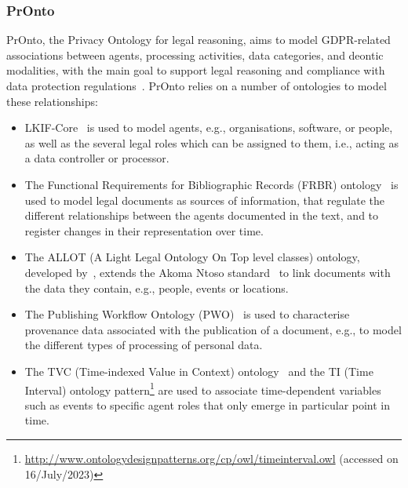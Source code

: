 \subsubsection{PrOnto}
\label{sec:pronto}

PrOnto, the Privacy Ontology for legal reasoning, aims to model GDPR-related associations between agents, processing activities, data categories, and deontic modalities, with the main goal to support legal reasoning and compliance with data protection regulations~\citep{ko_pronto_2018}.
PrOnto relies on a number of ontologies to model these relationships:
\begin{itemize}
    \item LKIF-Core~\citep{hoekstra_lkif_2007} is used to model agents, e.g., organisations, software, or people, as well as the several legal roles which can be assigned to them, i.e., acting as a data controller or processor.
    \item The Functional Requirements for Bibliographic Records (FRBR) ontology~\citep{byrum_functional_2009} is used to model legal documents as sources of information, that regulate the different relationships between the agents documented in the text, and to register changes in their representation over time. %
    \item The ALLOT (A Light Legal Ontology On Top level classes) ontology, developed by~\citep{barabucci_managing_2010}, extends the Akoma Ntoso standard~\citep{palmirani_akoma-ntoso_2011} to link documents with the data they contain, e.g., people, events or locations.
    \item The Publishing Workflow Ontology (PWO)~\citep{gangemi_publishing_2017} is used to characterise provenance data associated with the publication of a document, e.g., to model the different types of processing of personal data.
    \item The TVC (Time-indexed Value in Context) ontology~\citep{peroni_semantic_2014} and the TI (Time Interval) ontology pattern\footnote{\url{http://www.ontologydesignpatterns.org/cp/owl/timeinterval.owl} (accessed on 16/July/2023)} are used to associate time-dependent variables such as events to specific agent roles that only emerge in particular point in time.
\end{itemize}

